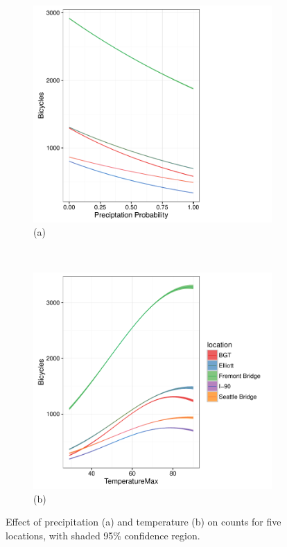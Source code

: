 \documentclass [11pt, proquest] {uwthesis}[2015/03/03]
\begin{document}
\begin{figure}[t!]
    \centering
    \begin{subfigure}[t]{0.5\textwidth}
        \centering
        \includegraphics[width=1\textwidth]{figures/5sites/Sim_precip1} 
        \caption{(a)}
    \end{subfigure}%
    ~
    \begin{subfigure}[t]{0.5\textwidth}
        \centering
        \includegraphics[width=1\textwidth]{figures/5sites/Sim_temp} 
        \caption{(b)}
    \end{subfigure}
    \caption{Effect of precipitation (a) and temperature (b) on counts for five locations, with shaded 95\% confidence region.}
    \label{fig:Sim_temp_precip}
\end{figure}
\end{document}
